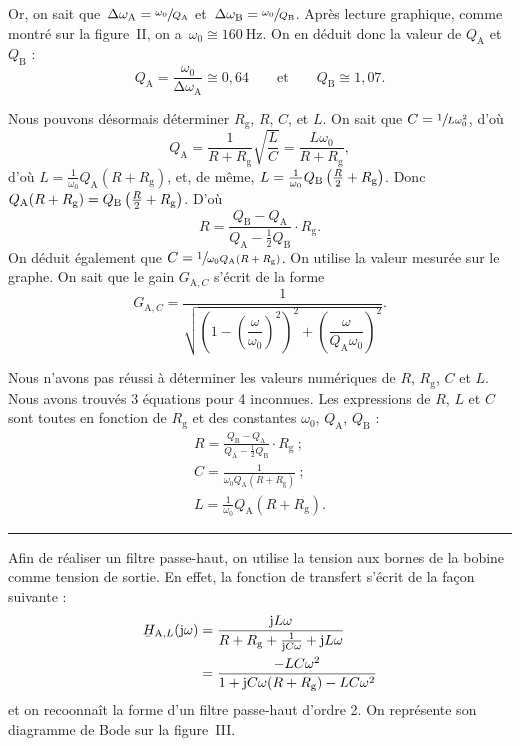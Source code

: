 \documentclass[a4paper]{article}
\begin{document}
	\begin{multicols}{2}
		Or, on sait que~$\mathrm{\Delta}\omega_\text{A} = \sfrac{\omega_0}{Q_\text{A}}$\/ et~$\mathrm{\Delta}\omega_\text{B} = \sfrac{\omega_0}{Q_\text{B}}$.
		Après lecture graphique, comme montré sur la figure~II, on a~$\omega_0 \cong 160\:\mathrm{Hz}$.
		On en déduit donc la valeur de $Q_\text{A}$\/ et $Q_\text{B}$\/ : \[
			Q_\text{A} = \frac{\omega_0}{\mathrm{\Delta}\omega_\text{A}} \cong 0{,}64\qquad\text{et}\qquad Q_\text{B} \cong 1{,}07
		.\]

		Nous pouvons désormais déterminer $R_\text{g}$, $R$, $C$, et $L$.
		On sait que $C = \sfrac{1}{L\omega_0^2}$, d'où \[
			Q_\text{A} = \frac{1}{R + R_\text{g}} \sqrt{\frac{L}{C}} = \frac{L\omega_0}{R + R_\text{g}},
		\] d'où $L = \frac{1}{\omega_0}Q_\text{A}(R+R_\text{g})$, et, de même, $L = \frac{1}{\omega_0}\*Q_\text{B}\*\left( \frac{R}{2} + R_\text{g} \right)$.
		Donc $Q_\text{A}\*(R + R_\text{g}) = Q_\text{B}\*\left( \frac{R}{2} + R_\text{g} \right)$. D'où  \[
			R = \frac{Q_\text{B} - Q_\text{A}}{Q_\text{A} - \frac{1}{2}Q_\text{B}} \cdot R_\text{g}
		.\]
		On déduit également que $C = \sfrac{1}{\omega_0Q_\text{A} (R + R_\text{g})}$.
		On utilise la valeur mesurée sur le graphe. On sait que le gain $G_{\text{A},C}$\/ s'écrit de la forme \[
			G_{\text{A},C} = \dfrac{1}{\sqrt{\left( 1 - \left( \dfrac{\omega}{\omega_0} \right)^2 \right)^2 + \left( \dfrac{\omega}{Q_\text{A}\omega_0} \right)^2}}.
		\]

		\smallskip

		Nous n'avons pas réussi à déterminer les valeurs numériques de $R$, $R_\text{g}$, $C$\/ et $L$. Nous avons trouvés 3 équations pour 4 inconnues.
		Les expressions de $R$, $L$\/ et $C$\/ sont toutes en fonction de $R_\text{g}$\/ et des constantes $\omega_0$, $Q_\text{A}$, $Q_\text{B}$\/ : 
		\begin{gather*}
			\boxed{R = \frac{Q_\text{B} - Q_\text{A}}{Q_\text{A} - \frac{1}{2}Q_\text{B}} \cdot R_\text{g}}\ ;\\
			\boxed{C = \frac{1}{\omega_0 Q_\text{A} (R + R_\text{g})}}\ ;\\
			\boxed{L = \frac{1}{\omega_0}Q_\text{A} (R + R_\text{g}).}
		\end{gather*}

		\bigskip
		\hrule

		Afin de réaliser un filtre passe-haut, on utilise la tension aux bornes de la bobine comme tension de sortie. En effet, la fonction de transfert s'écrit de la façon suivante : 
		\begin{align*}
			\ubar{H}_{\text{A},L}(\mathrm{j}\omega) &= \frac{\mathrm{j}L\omega}{R + R_\text{g} + \frac{1}{\mathrm{j}C\omega} + \mathrm{j}L\omega}\\
			&= \frac{-LC\omega^2}{1 + \mathrm{j}C\omega(R + R_\text{g}) - LC\omega^2} \\
		\end{align*}
		et on recoonnaît la forme d'un filtre passe-haut d'ordre 2. On représente son diagramme de {\sc Bode}\/ sur la figure~III.
	\end{multicols}
\end{document}
